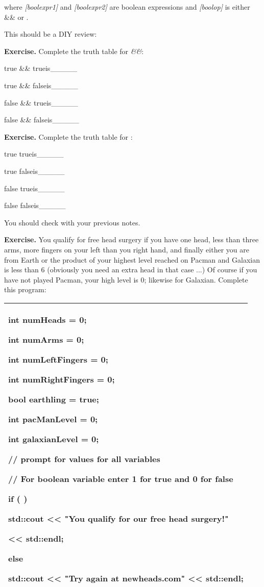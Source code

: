 \documentclass[
]{article}
\begin{document}
where \emph{{[}boolexpr1{]}} and \emph{{[}boolexpr2{]}} are boolean
expressions and \emph{{[}boolop{]}} is either \&\& or \textbar\textbar.

This should be a DIY review:

\textbf{Exercise.} Complete the truth table for \emph{\&\&}:

true \&\& trueis\_\_\_\_\_

true \&\& falseis\_\_\_\_\_

false \&\& trueis\_\_\_\_\_

false \&\& falseis\_\_\_\_\_

\textbf{Exercise.} Complete the truth table for
\emph{\textbar\textbar{}}:

true \textbar\textbar{} trueis\_\_\_\_\_

true \textbar\textbar{} falseis\_\_\_\_\_

false \textbar\textbar{} trueis\_\_\_\_\_

false \textbar\textbar{} falseis\_\_\_\_\_

You should check with your previous notes.

\textbf{Exercise.} You qualify for free head surgery if you have one
head, less than three arms, more fingers on your left than you right
hand, and finally either you are from Earth or the product of your
highest level reached on Pacman and Galaxian is less than 6 (obviously
you need an extra head in that case ...) Of course if you have not
played Pacman, your high level is 0; likewise for Galaxian. Complete
this program:

\begin{longtable}[]{@{}l@{}}
\toprule
\endhead
\begin{minipage}[t]{0.97\columnwidth}\raggedright
int numHeads = 0;

int numArms = 0;

int numLeftFingers = 0;

int numRightFingers = 0;

bool earthling = true;

int pacManLevel = 0;

int galaxianLevel = 0;

// prompt for values for all variables

// For boolean variable enter 1 for true and 0 for false

if ( )

std::cout \textless\textless{} "You qualify for our free head surgery!"

\textless\textless{} std::endl;

else

std::cout \textless\textless{} "Try again at newheads.com"
\textless\textless{} std::endl;\strut
\end{minipage}\tabularnewline
\bottomrule
\end{longtable}
\end{document}
